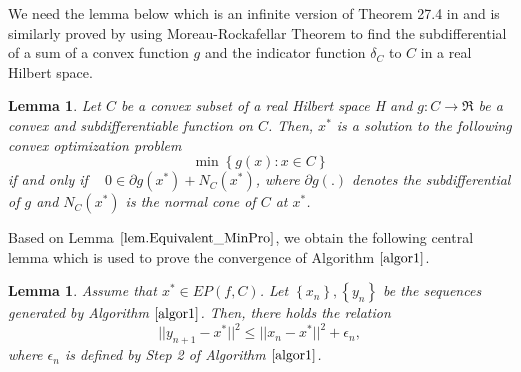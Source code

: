 \documentclass{aims}
\newtheorem{lemma}[theorem]{Lemma}
\theoremstyle{definition}
\begin{document}
We need the lemma below which is an infinite version of Theorem 27.4 in \cite{R1970} and is similarly proved by using
Moreau-Rockafellar Theorem to find the subdifferential of a sum of a convex function $g$ and the indicator function 
$\delta_C$ to $C$ in a real Hilbert space.
\begin{lemma}\label{lem.Equivalent_MinPro}
Let $C$ be a convex subset of a real Hilbert space H and $g:C\to \Re$ be a convex and subdifferentiable function on $C$. Then, 
$x^*$ is a solution to the following convex optimization problem
\begin{equation*}\min\left\{g(x):x\in C\right\}
\end{equation*}
if and only if  ~  $0\in \partial g(x^*)+N_C(x^*)$, where $\partial g(.)$ denotes the subdifferential of $g$ and $N_C(x^*)$ is the normal cone 
of  $C$ at $x^*$.
\end{lemma}
Based on Lemma $\ref{lem.Equivalent_MinPro}$, we obtain the following central lemma which is used to prove the convergence 
of Algorithm $\ref{algor1}$.
\begin{lemma}\label{lem1}
Assume that $x^*\in EP(f,C)$. Let $\left\{x_n\right\},\left\{y_n\right\}$ be the sequences generated by Algorithm $\ref{algor1}$. Then, there holds the relation
$$
 ||y_{n+1} - x^*||^2\leq ||x_n-x^*||^2+\epsilon_n,
$$
where $\epsilon_n$ is defined by Step 2 of Algorithm $\ref{algor1}$.
\end{lemma}
\end{document}
